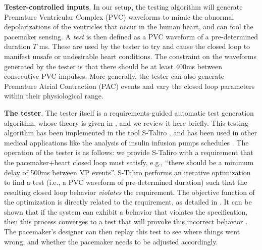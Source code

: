 \textbf{Tester-controlled inputs}.
In our setup, the testing algorithm will generate Premature Ventricular Complex (PVC) waveforms to mimic the abnormal depolarizations of the ventricles that occur in the human heart, and can fool the pacemaker sensing. 
A \emph{test} is then defined as a PVC waveform of a pre-determined duration $T$ ms.
These are used by the tester to try and cause the closed loop to manifest unsafe or undesirable heart conditions.
The constraint on the waveforms generated by the tester is that there should be at least 400ms between consecutive PVC impulses.
More generally, the tester can also generate Premature Atrial Contraction (PAC) events and vary the closed loop parameters within their physiological range.

\textbf{The tester}.
The tester itself is a requirements-guided automatic test generation algorithm, whose theory is given in \cite{AbbasFSIG13tecs}, and we review it here briefly.
This testing algorithm has been implemented in the tool S-Taliro \cite{AnnapureddyLFS11tacas}, and has been used in other medical applications like the analysis of insulin infusion pumps schedules \cite{SankaranarayananF2012cmsb}.
The operation of the tester is as follows: we provide S-Taliro with a requirement that the pacemaker+heart closed loop must satisfy,
e.g., ``there should be a minimum delay of 500ms between VP events''.
S-Taliro performs an iterative optimization to find a test (i.e., a PVC waveform of pre-determined duration) such that the resulting closed loop behavior \emph{violates} the requirement.
The objective function of the optimization is directly related to the requirement, as detailed in \cite{AbbasFSIG13tecs}.
It can be shown that if the system can exhibit a behavior that violates the specification, then this process converges to a test that will provoke this incorrect behavior \cite{AbbasFSIG13tecs}. 
The pacemaker's designer can then replay this test to see where things went wrong, and whether the pacemaker needs to be adjusted accordingly.

